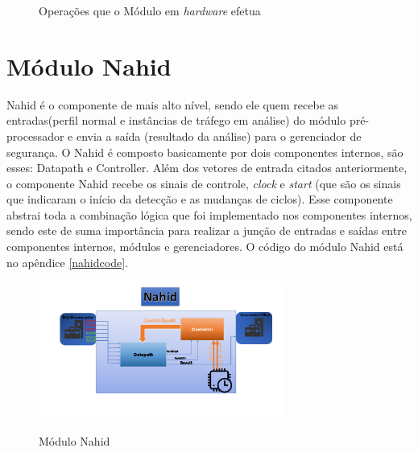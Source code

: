 \begin{figure}[!htb]
	\centering
	\quad %
	\caption{Operações que o Módulo em \textit{hardware} efetua}
	\label{fig01}
\end{figure}

\section{Módulo Nahid}\label{Sub:equa}

Nahid é o componente de mais alto nível, sendo ele quem recebe as entradas(perfil normal e instâncias de tráfego em análise) do módulo pré-processador e envia a saída (resultado da análise) para o gerenciador de segurança. O Nahid é composto basicamente por dois componentes  internos, são esses: Datapath e Controller.  Além dos vetores de entrada citados anteriormente, o componente  Nahid recebe os sinais de controle, \textit{clock} e \textit{start} (que são os sinais que indicaram o início da detecção e as mudanças de ciclos). Esse componente  abstrai toda a combinação lógica que foi implementado nos componentes  internos, sendo este de suma importância para realizar a junção de entradas e saídas entre componentes internos, módulos e  gerenciadores. O código do módulo Nahid está no apêndice \ref{nahidcode}.
\begin{figure}[H]
	\centering
	\includegraphics[width=8cm]{figures/NahidModule.png}\\
	\caption{Módulo Nahid}
\end{figure}


